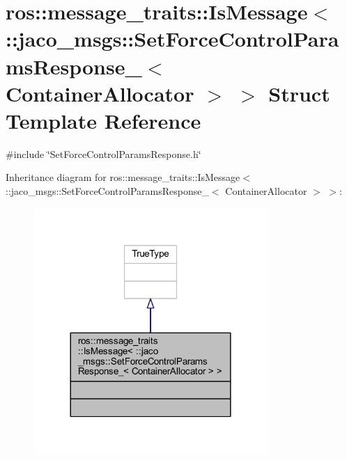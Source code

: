 \hypertarget{structros_1_1message__traits_1_1IsMessage_3_01_1_1jaco__msgs_1_1SetForceControlParamsResponse___e75409f12a4732c09eeb8d293efb6faf}{}\section{ros\+:\+:message\+\_\+traits\+:\+:Is\+Message$<$ \+:\+:jaco\+\_\+msgs\+:\+:Set\+Force\+Control\+Params\+Response\+\_\+$<$ Container\+Allocator $>$ $>$ Struct Template Reference}
\label{structros_1_1message__traits_1_1IsMessage_3_01_1_1jaco__msgs_1_1SetForceControlParamsResponse___e75409f12a4732c09eeb8d293efb6faf}


{\ttfamily \#include \char`\"{}Set\+Force\+Control\+Params\+Response.\+h\char`\"{}}



Inheritance diagram for ros\+:\+:message\+\_\+traits\+:\+:Is\+Message$<$ \+:\+:jaco\+\_\+msgs\+:\+:Set\+Force\+Control\+Params\+Response\+\_\+$<$ Container\+Allocator $>$ $>$\+:
\nopagebreak
\begin{figure}[H]
\begin{center}
\leavevmode
\includegraphics[width=252pt]{d9/d21/structros_1_1message__traits_1_1IsMessage_3_01_1_1jaco__msgs_1_1SetForceControlParamsResponse___07686da7150310fd5ff3af87b656d6e9}
\end{center}
\end{figure}


